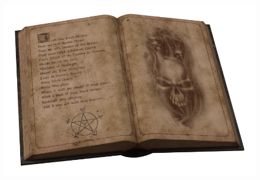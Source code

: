\begin{figure}[h]
\begin{center}
\includegraphics[scale=0.15]{img/OpenBook.png}
\end{center}
\end{figure}

